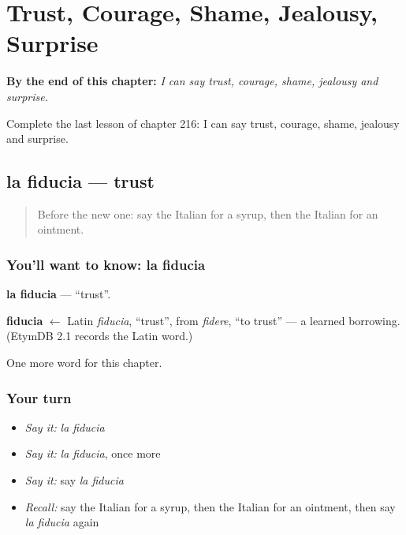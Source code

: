 
\chapter{Trust, Courage, Shame, Jealousy, Surprise}
\label{ch:it-trust-courage-shame-jealousy-surprise}

\begin{chapteropening}
\textbf{By the end of this chapter:} \emph{I can say trust, courage, shame, jealousy and surprise.}

Complete the last lesson of chapter 216: I can say trust, courage, shame, jealousy and surprise.
\end{chapteropening}

\section[la fiducia]{la fiducia — trust}

\label{lesson:IT-C216-fiducia}



\begin{quote}
Before the new one: say the Italian for a syrup, then the Italian for an ointment.
\end{quote}

\subsection*{You'll want to know: la fiducia}
\textbf{la fiducia} — \textquotedblleft{}trust\textquotedblright{}.

\begin{cousinweb}
\textbf{fiducia} $\leftarrow$ Latin \emph{fiducia}, \textquotedblleft{}trust\textquotedblright{}, from \emph{fidere}, \textquotedblleft{}to trust\textquotedblright{} — a learned borrowing. (EtymDB 2.1 records the Latin word.)
\end{cousinweb}

\begin{grammarlens}[title={What you've built}]
One more word for this chapter.
\end{grammarlens}

\subsection*{Your turn}
\begin{itemize}
\raggedright
  \item \emph{Say it:} \emph{la fiducia}
  \item \emph{Say it:} \emph{la fiducia}, once more
  \item \emph{Say it:} say \emph{la fiducia}
  \item \emph{Recall:} say the Italian for a syrup, then the Italian for an ointment, then say \emph{la fiducia} again
\end{itemize}

